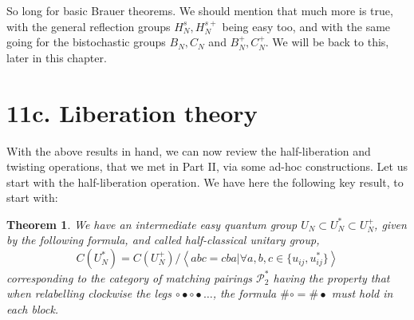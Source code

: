 \documentclass[12pt]{amsbook}
\newtheorem{theorem}{Theorem}[chapter]
\begin{document}
So long for basic Brauer theorems. We should mention that much more is true, with the general reflection groups $H_N^s,H_N^{s+}$ being easy too, and with the same going for the bistochastic groups $B_N,C_N$ and $B_N^+,C_N^+$. We will be back to this, later in this chapter.

\section*{11c. Liberation theory}

With the above results in hand, we can now review the half-liberation and twisting operations, that we met in Part II, via some ad-hoc constructions. Let us start with the half-liberation operation. We have here the following key result, to start with: 

\begin{theorem}
We have an intermediate easy quantum group $U_N\subset U_N^*\subset U_N^+$, given by the following formula, and called half-classical unitary group,
$$C(U_N^*)=C(U_N^+)\Big/\left<abc=cba\Big|\forall a,b,c\in\{u_{ij},u_{ij}^*\}\right>$$
corresponding to the category of matching pairings $\mathcal P_2^*$ having the property that when relabelling clockwise the legs $\circ\bullet\circ\bullet\ldots$, the formula $\#\circ=\#\bullet$ must hold in each block.
\end{theorem}
\end{document}
